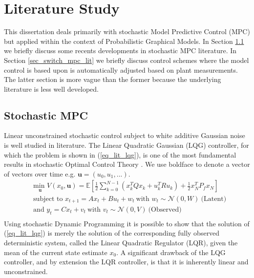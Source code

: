 \section{Literature Study}
This dissertation deals primarily with stochastic Model Predictive Control (MPC) but applied within the context of Probabilistic Graphical Models. In Section \ref{sec_stoch_mpc_lit} we briefly discuss some recents developments in stochastic MPC literature. In Section \ref{sec_switch_mpc_lit} we briefly discuss control schemes where the model control is based upon is automatically adjusted based on plant measurements. The latter section is more vague than the former because the underlying literature is less well developed.

\subsection{Stochastic MPC}
\label{sec_stoch_mpc_lit}
Linear unconstrained stochastic control subject to white additive Gaussian noise is well studied in literature. The Linear Quadratic Gaussian (LQG) controller, for which the problem is shown in (\ref{eq_lit_lqg}), is one of the most fundamental results in stochastic Optimal Control Theory \cite{lqg}. We use boldface to denote a vector of vectors over time e.g. $\mathbf{u}=(u_0, u_1,...)$.
\begin{equation}
\begin{aligned}
&\underset{\mathbf{u}}{\text{min }} V(x_0, \mathbf{u}) = \mathbb{E}\left[ \frac{1}{2}\sum_{k=0}^{N-1} \left( x_k^TQx_k + u_k^TRu_k \right) + \frac{1}{2}x_N^TP_fx_N \right] \\
& \text{subject to } x_{t+1}=Ax_t+Bu_t + w_t~\text{with } w_t \sim \mathcal{N}(0, W)~\text{(Latent)} \\
& \text{and } y_{t}= Cx_t + v_t ~\text{with } v_t \sim \mathcal{N}(0, V)~\text{(Observed)}\\
\end{aligned}
\label{eq_lit_lqg}
\end{equation}
Using stochastic Dynamic Programming it is possible to show that the solution of (\ref{eq_lit_lqg}) is merely the solution of the corresponding fully observed deterministic system, called the Linear Quadratic Regulator (LQR), given the mean of the current state estimate $x_0$. A significant drawback of the LQG controller, and by extension the LQR controller, is that it is inherently linear and unconstrained.

